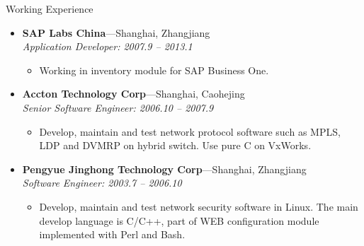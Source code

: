 \documentclass[11pt,oneside]{article}
\newenvironment{ressection}[1]{
	\vspace{4pt}
	{\selectfont\Large#1}
	\begin{itemize}
	\vspace{3pt}
}{
	\end{itemize}
}
\newcommand{\ressubitem}[1]{
	\vspace{-1pt}
	\item \begin{flushleft} #1 \end{flushleft}
}
\newcommand{\resbigitem}[3]{
	\vspace{-5pt}
	\item
	\textbf{#1}---#2 \\
	\textit{#3}
}
\newenvironment{ressubsec}[3]{
	\resbigitem{#1}{#2}{#3}
	\vspace{-2pt}
	\begin{itemize}
}{
    \end{itemize}
}
\begin{document}
\begin{ressection}{Working Experience}
	\begin{ressubsec}{SAP Labs China}{Shanghai, Zhangjiang}{Application Developer: 2007.9 -- 2013.1}
		\ressubitem{Working in inventory module for SAP Business One.}
	\end{ressubsec}

	\begin{ressubsec}{Accton Technology Corp}{Shanghai, Caohejing}{Senior Software Engineer: 2006.10 -- 2007.9}
		\ressubitem{Develop, maintain and test network protocol software such as MPLS, LDP and DVMRP on
			hybrid switch. Use pure C on VxWorks.}
	\end{ressubsec}

	\begin{ressubsec}{Pengyue Jinghong Technology Corp}{Shanghai, Zhangjiang}{Software Engineer: 2003.7 -- 2006.10}
		\ressubitem{Develop, maintain and test network security software in Linux. The main develop
			language is C/C++, part of WEB configuration module implemented with Perl and Bash.}
	\end{ressubsec}

\end{ressection}
\end{document}
